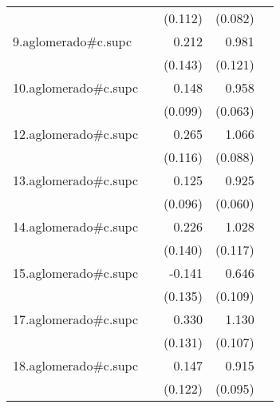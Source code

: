 {\begin{longtable}{l*{4}{D{.}{.}{-1}}}
            &                     &     (0.112)         &     (0.082)         &                     \\
\addlinespace
9.aglomerado#c.supc&                     &       0.212         &       0.981\sym{***}&                     \\
            &                     &     (0.143)         &     (0.121)         &                     \\
\addlinespace
10.aglomerado#c.supc&                     &       0.148         &       0.958\sym{***}&                     \\
            &                     &     (0.099)         &     (0.063)         &                     \\
\addlinespace
12.aglomerado#c.supc&                     &       0.265\sym{*}  &       1.066\sym{***}&                     \\
            &                     &     (0.116)         &     (0.088)         &                     \\
\addlinespace
13.aglomerado#c.supc&                     &       0.125         &       0.925\sym{***}&                     \\
            &                     &     (0.096)         &     (0.060)         &                     \\
\addlinespace
14.aglomerado#c.supc&                     &       0.226         &       1.028\sym{***}&                     \\
            &                     &     (0.140)         &     (0.117)         &                     \\
\addlinespace
15.aglomerado#c.supc&                     &      -0.141         &       0.646\sym{***}&                     \\
            &                     &     (0.135)         &     (0.109)         &                     \\
\addlinespace
17.aglomerado#c.supc&                     &       0.330\sym{*}  &       1.130\sym{***}&                     \\
            &                     &     (0.131)         &     (0.107)         &                     \\
\addlinespace
18.aglomerado#c.supc&                     &       0.147         &       0.915\sym{***}&                     \\
            &                     &     (0.122)         &     (0.095)         &                     \\

\end{longtable}}
